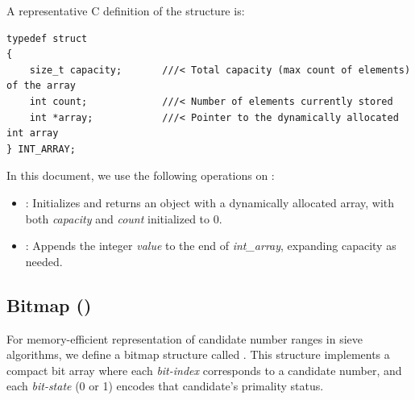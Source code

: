 \documentclass{article}
\begin{document}
A representative C definition of the  structure is:
\begin{verbatim}
typedef struct
{
    size_t capacity;       ///< Total capacity (max count of elements) of the array
    int count;             ///< Number of elements currently stored
    int *array;            ///< Pointer to the dynamically allocated int array
} INT_ARRAY;
\end{verbatim}
In this document, we use the following operations on :
\begin{itemize}[noitemsep]
    \item {}: Initializes and returns an  object with a dynamically allocated array, with both \emph{capacity} and \emph{count} initialized to 0.
    \item {}: Appends the integer \emph{value} to the end of \emph{int\_array}, expanding capacity as needed.
\end{itemize}

\subsection{Bitmap ()}

For memory-efficient representation of candidate number ranges in sieve algorithms, we define a bitmap structure called . This structure implements a compact bit array where each \emph{bit-index} corresponds to a candidate number, and each \emph{bit-state} (0 or 1) encodes that candidate's primality status.
\end{document}
